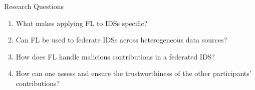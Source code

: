 \begin{frame}{Research Questions}
  \begin{enumerate}
    \item What makes applying FL to IDSs specific?
    \item Can FL be used to federate IDSs across heterogeneous data sources?
    \item How does FL handle malicious contributions in a federated IDS?
    \item How can one assess and ensure the trustworthiness of the other participants’ contributions?
  \end{enumerate}
\end{frame}